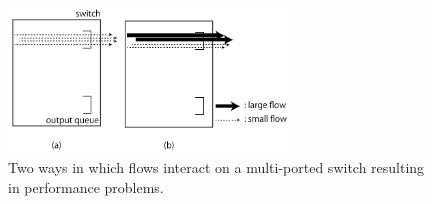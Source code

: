 \documentclass[10pt, a4paper, twocolumn]{jsarticle}
\begin{document}
\begin{figure}[h]
    \begin{center}
    \includegraphics[autoebb, width=210pt]{./img/impairments.pdf}
    \caption{Two ways in which flows interact on a multi-ported switch
    resulting in performance problems.}
    \label{fig:impair}
    \end{center}
\end{figure}
\end{document}
